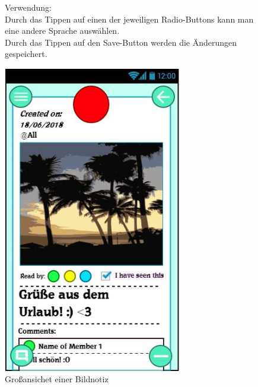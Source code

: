 \documentclass[a4paper]{scrreprt}
\begin{document}
\begin{figure}[h!]
\begin{minipage}[t]{0.6\linewidth}
\begin{itemize}
    			\end{itemize}
    			
    			\hfill 
    			
    			Verwendung:\\
    			Durch das Tippen auf einen der jeweiligen
    			Radio-Buttons kann man eine andere Sprache
    			auswählen.\\
    			Durch das Tippen auf den
    			Save-Button werden die Änderungen
    			gespeichert.
    			
    			
    		\end{minipage}
    	\end{figure}
    	
    	\clearpage
    	
    	\begin{figure}[h!]
    		\begin{minipage}[t]{0.4\linewidth}
    			\flushright
    			\centering
    			\vspace{9mm}
    			\includegraphics[width=0.7\textwidth]{fridget_picnotebig.JPG}
    			\caption{Großansichet einer Bildnotiz}
    			\label{fig:figure1}
    		\end{minipage}

\end{figure}
\end{document}
